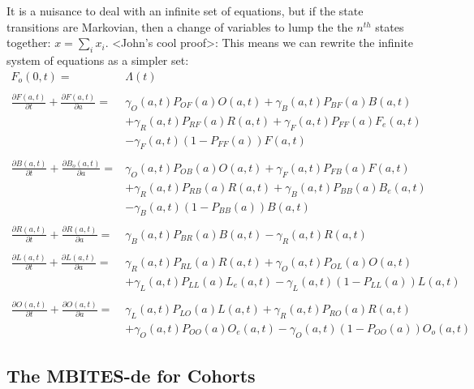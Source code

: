 \documentclass{article}
\begin{document}
It is a nuisance to deal with an infinite set of equations, but if the state transitions are Markovian, then a change of variables to lump the the $n^{th}$ states together: $x = \sum_i x_i$. <John's cool proof>:  This means we can rewrite the infinite system of equations as a simpler set:
%
\begin{equation}\begin{array}{rl}
F_o(0,t) =& \Lambda(t) \\ 
%
&\\
\frac{\partial F(a,t)}{\partial t} + \frac{\partial F(a,t)}{\partial a} =& 
\gamma_O(a,t) P_{OF}(a) O(a,t) 
+ \gamma_B(a,t) P_{BF}(a) B(a,t) \\&
 + \gamma_R(a,t) P_{RF}(a) R(a,t)
+ \gamma_F(a,t) P_{FF}(a) F_e(a,t) \\ &
- \gamma_F(a,t) \left( 1-P_{FF}(a) \right) F(a,t) \\ 
%
%
&\\
\frac{\partial B(a,t)}{\partial t} + \frac{\partial B_o(a,t)}{\partial a} =&  \gamma_O(a,t) P_{OB}(a) O(a,t) + \gamma_F(a,t) P_{FB}(a) F(a,t) \\ & 
+ \gamma_R(a,t) P_{RB}(a) R(a,t) 
+ \gamma_B(a,t) P_{BB}(a) B_e(a,t)\\ & 
- \gamma_B(a,t) \left( 1-P_{BB}(a) \right) B(a,t) \\ 
%
&\\
\frac{\partial R(a,t)}{\partial t} + \frac{\partial R(a,t)}{\partial a} =&  \gamma_B(a,t) P_{BR}(a) B(a,t) - \gamma_R(a,t) R(a,t)\\ 
%
&\\
\frac{\partial L(a,t)}{\partial t} + \frac{\partial L(a,t)}{\partial a} =& \gamma_R(a,t) P_{RL}(a) R(a,t) + 
\gamma_O(a,t) P_{OL}(a) O(a,t) \\&
+ \gamma_L(a,t)  P_{LL}(a) L_e(a,t)
- \gamma_L(a,t) \left( 1-P_{LL}(a) \right)  L(a,t)
\\ 
%
&\\
\frac{\partial O(a,t)}{\partial t} + \frac{\partial O(a,t)}{\partial a} =& \gamma_L(a,t) P_{LO}(a) L(a,t) 
+ \gamma_R(a,t) P_{RO}(a) R(a,t)  
\\&
+ \gamma_O(a,t) P_{OO}(a) O_e(a,t)
- \gamma_O(a,t) \left( 1-P_{OO}(a) \right) O_o(a,t)

%
\end{array}\end{equation}


\subsection{The MBITES-de for Cohorts}
\end{document}
